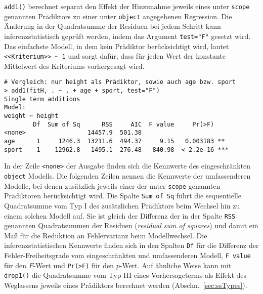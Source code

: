 \lstinline!add1()! berechnet separat den Effekt der Hinzunahme jeweils eines unter \lstinline!scope! genannten Prädiktors zu einer unter \lstinline!object! angegebenen Regression. Die Änderung in der Quadratsumme der Residuen bei jedem Schritt kann inferenzstatistisch geprüft werden, indem das Argument \lstinline!test="F"! gesetzt wird. Das einfachste Modell, in dem kein Prädiktor berücksichtigt wird, lautet \lstinline!<<Kriterium>> ~ 1! und sorgt dafür, dass für jeden Wert der konstante Mittelwert des Kriteriums vorhergesagt wird.
\begin{lstlisting}
# Vergleich: nur height als Prädiktor, sowie auch age bzw. sport
> add1(fitH, . ~ . + age + sport, test="F")
Single term additions
Model:
weight ~ height
        Df  Sum of Sq      RSS     AIC  F value     Pr(>F)
<none>                 14457.9  501.38
age      1     1246.3  13211.6  494.37     9.15   0.003183 **
sport    1    12962.8   1495.1  276.48   840.98  < 2.2e-16 ***
\end{lstlisting}

In der Zeile \lstinline!<none>! der Ausgabe finden sich die Kennwerte des eingeschränkten \lstinline!object! Modells. Die folgenden Zeilen nennen die Kennwerte der umfassenderen Modelle, bei denen zusätzlich jeweils einer der unter \lstinline!scope! genannten Prädiktoren berücksichtigt wird. Die Spalte \lstinline!Sum of Sq! führt die sequentielle Quadratsumme vom Typ I des zusätzlichen Prädiktors beim Wechsel hin zu einem solchen Modell auf. Sie ist gleich der Differenz der in der Spalte \lstinline!RSS! genannten Quadratsummen der Residuen (\emph{residual sum of squares}) und damit ein Maß für die Reduktion an Fehlervarianz beim Modellwechsel. Die inferenzstatistischen Kennwerte finden sich in den Spalten \lstinline!Df! für die Differenz der Fehler-Freiheitsgrade vom eingeschränkten und umfassenderen Modell, \lstinline!F value! für den $F$-Wert und \lstinline!Pr(>F)! für den $p$-Wert. Auf ähnliche Weise kann mit \lstinline!drop1()! die Quadratsumme vom Typ III eines Vorhersageterms als Effekt des Weglassens jeweils eines Prädiktors berechnet werden (Abschn.\ \ref{sec:ssTypes}).

